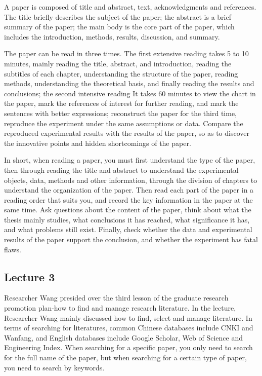 \documentclass[UTF-8]{ctexart}
\begin{document}
A paper is composed of title and abstract, text, acknowledgments and references. The title briefly describes the subject of the paper; the abstract is a brief summary of the paper; the main body is the core part of the paper, which includes the introduction, methods, results, discussion, and summary.

The paper can be read in three times. The first extensive reading takes 5 to 10 minutes, mainly reading the title, abstract, and introduction, reading the subtitles of each chapter, understanding the structure of the paper, reading methods, understanding the theoretical basis, and finally reading the results and conclusions; the second intensive reading It takes 60 minutes to view the chart in the paper, mark the references of interest for further reading, and mark the sentences with better expressions; reconstruct the paper for the third time, reproduce the experiment under the same assumptions or data. Compare the reproduced experimental results with the results of the paper, so as to discover the innovative points and hidden shortcomings of the paper.

In short, when reading a paper, you must first understand the type of the paper, then through reading the title and abstract to understand the experimental objects, data, methods and other information, through the division of chapters to understand the organization of the paper. Then read each part of the paper in a reading order that suits you, and record the key information in the paper at the same time. Ask questions about the content of the paper, think about what the thesis mainly studies, what conclusions it has reached, what significance it has, and what problems still exist. Finally, check whether the data and experimental results of the paper support the conclusion, and whether the experiment has fatal flaws.

\subsection{Lecture 3}
Researcher Wang presided over the third lesson of the graduate research promotion plan-how to find and manage research literature. In the lecture, Researcher Wang mainly discussed how to find, select and manage literature.
In terms of searching for literatures, common Chinese databases include CNKI and Wanfang, and English databases include Google Scholar, Web of Science and Engineering Index. When searching for a specific paper, you only need to search for the full name of the paper, but when searching for a certain type of paper, you need to search by keywords.
\end{document}
